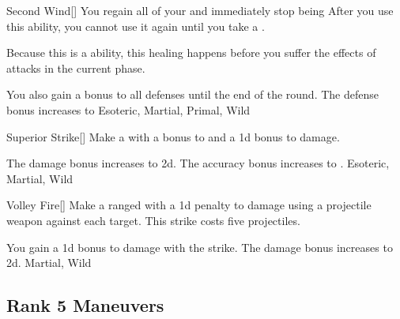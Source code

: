 \lowercase{\hypertarget{maneuver:Second Wind}{}}\label{maneuver:Second Wind}
\hypertarget{maneuver:Second Wind}{}
\begin{freeability}[Rank 4]{Second Wind}[]
You regain all of your  and immediately stop being 
After you use this ability, you cannot use it again until you take a .

Because this is a  ability, this healing happens before you suffer the effects of attacks in the current phase.

\rankline
{} You also gain a  bonus to all defenses until the end of the round.
 The defense bonus increases to 
 Esoteric, Martial, Primal, Wild
\end{freeability}
\vspace{0.25em}



\lowercase{\hypertarget{maneuver:Superior Strike}{}}\label{maneuver:Superior Strike}
\hypertarget{maneuver:Superior Strike}{}
\begin{freeability}[Rank 4]{Superior Strike}[]
Make a  with a  bonus to  and a \plus1d bonus to damage.

\rankline
{} The damage bonus increases to \plus2d.
 The accuracy bonus increases to .
 Esoteric, Martial, Wild
\end{freeability}
\vspace{0.25em}



\lowercase{\hypertarget{maneuver:Volley Fire}{}}\label{maneuver:Volley Fire}
\hypertarget{maneuver:Volley Fire}{}
\begin{freeability}[Rank 4]{Volley Fire}[]
Make a ranged  with a \minus1d penalty to damage using a projectile weapon against each target.
This strike costs five projectiles.

\rankline
{} You gain a \plus1d bonus to damage with the strike.
 The damage bonus increases to \plus2d.
 Martial, Wild
\end{freeability}
\vspace{0.25em}


\subsection{Rank 5 Maneuvers}
